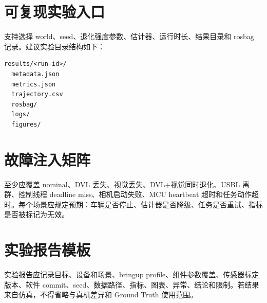 \section{可复现实验入口}
 支持选择 world、seed、退化强度参数、估计器、运行时长、结果目录和 rosbag 记录。建议实验目录结构如下：
\begin{lstlisting}[caption={实验输出目录约定}]
results/<run-id>/
  metadata.json
  metrics.json
  trajectory.csv
  rosbag/
  logs/
  figures/
\end{lstlisting}

\section{故障注入矩阵}
至少应覆盖 nominal、DVL 丢失、视觉丢失、DVL+视觉同时退化、USBL 离群、控制线程 deadline miss、相机启动失败、MCU heartbeat 超时和任务动作超时。每个场景应规定预期：车辆是否停止、估计器是否降级、任务是否重试、指标是否被标记为无效。

\section{实验报告模板}
实验报告应记录目标、设备和场景、bringup profile、组件参数覆盖、传感器标定版本、软件 commit、seed、数据路径、指标、图表、异常、结论和限制。若结果来自仿真，不得省略与真机差异和 Ground Truth 使用范围。
